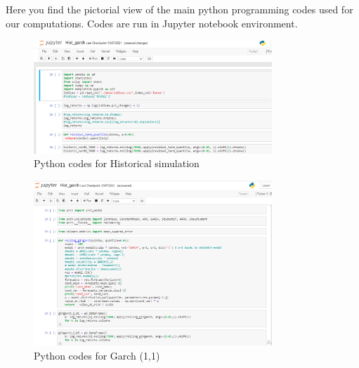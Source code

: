 \documentclass[a4paper,11pt,oneside]{book}
\begin{document}
\begin{appendix}
	\chapter{}
	
	Here you find the pictorial view of the main python programming codes used for our computations. Codes are run in Jupyter notebook environment.
	\begin{figure}[!h]
		\centering
		\includegraphics[width=0.8\textwidth]{figures/code1}
		\caption{Python codes for Historical simulation}
	
	\end{figure}
	
	\begin{figure}[!h]
		\centering
		\includegraphics[width=0.8\textwidth]{figures/code2}
		\caption{Python codes for Garch (1,1)}
	\end{figure}
	

\end{appendix}
\end{document}
